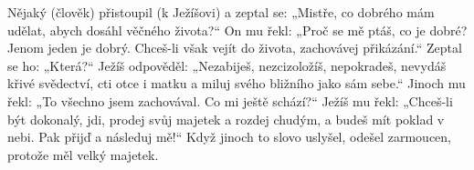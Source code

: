 \documentclass[12pt]{article}
\begin{document}
\charisfont
\noindent

\bigskip

​Nějaký (člověk) přistoupil (k Ježíšovi) a zeptal se: „Mistře, co dobrého mám udělat, abych dosáhl věčného života?“ On mu řekl: „Proč se mě ptáš, co je dobré? Jenom jeden je dobrý. Chceš-li však vejít do života, zachovávej přikázání.“ Zeptal se ho: „Která?“ Ježíš odpověděl: „Nezabiješ, nezcizoložíš, nepokradeš, nevydáš křivé svědectví, cti otce i matku a miluj svého bližního jako sám sebe.“ Jinoch mu řekl: „To všechno jsem zachovával. Co mi ještě schází?“ Ježíš mu řekl: „Chceš-li být dokonalý, jdi, prodej svůj majetek a rozdej chudým, a budeš mít poklad v nebi. Pak přijď a následuj mě!“ Když jinoch to slovo uslyšel, odešel zarmoucen, protože měl velký majetek.


\bigskip \bigskip
\newpage

\tengwarfont
\sloppy  %
\noindent


\bigskip
\raggedright %
\end{document}
